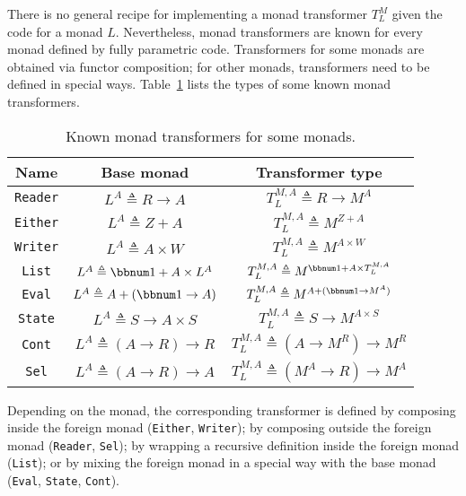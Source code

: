 There is no general recipe for implementing a monad transformer $T_{L}^{M}$
given the code for a monad $L$. Nevertheless, monad transformers
are known for every monad defined by fully parametric code. Transformers
for some monads are obtained via functor composition; for other monads,
transformers need to be defined in special ways. Table~\ref{tab:Known-monad-transformers}
lists the types of some known monad transformers.
\begin{table}
\begin{centering}
\begin{tabular}{|c|c|c|}
\hline 
\textbf{\small{}Name} & \textbf{\small{}Base monad} & \textbf{\small{}Transformer type}\tabularnewline
\hline 
\hline 
{\small{}}\lstinline!Reader! & {\small{}$L^{A}\triangleq R\rightarrow A$} & {\small{}$T_{L}^{M,A}\triangleq R\rightarrow M^{A}$}\tabularnewline
\hline 
{\small{}}\lstinline!Either! & {\small{}$L^{A}\triangleq Z+A$} & {\small{}$T_{L}^{M,A}\triangleq M^{Z+A}$}\tabularnewline
\hline 
{\small{}}\lstinline!Writer! & {\small{}$L^{A}\triangleq A\times W$} & {\small{}$T_{L}^{M,A}\triangleq M^{A\times W}$}\tabularnewline
\hline 
{\small{}}\lstinline!List! & {\small{}$L^{A}\triangleq\bbnum 1+A\times L^{A}$} & {\small{}$T_{L}^{M,A}\triangleq M^{\bbnum 1+A\times T_{L}^{M,A}}$}\tabularnewline
\hline 
{\small{}}\lstinline!Eval! & {\small{}$L^{A}\triangleq A+\left(\bbnum 1\rightarrow A\right)$} & {\small{}$T_{L}^{M,A}\triangleq M^{A+(\bbnum 1\rightarrow M^{A})}$}\tabularnewline
\hline 
{\small{}}\lstinline!State! & {\small{}$L^{A}\triangleq S\rightarrow A\times S$} & {\small{}$T_{L}^{M,A}\triangleq S\rightarrow M^{A\times S}$}\tabularnewline
\hline 
{\small{}}\lstinline!Cont! & {\small{}$L^{A}\triangleq\left(A\rightarrow R\right)\rightarrow R$} & {\small{}$T_{L}^{M,A}\triangleq(A\rightarrow M^{R})\rightarrow M^{R}$}\tabularnewline
\hline 
{\small{}}\lstinline!Sel! & {\small{}$L^{A}\triangleq\left(A\rightarrow R\right)\rightarrow A$} & {\small{}$T_{L}^{M,A}\triangleq(M^{A}\rightarrow R)\rightarrow M^{A}$}\tabularnewline
\hline 
\end{tabular}
\par\end{centering}
\caption{\label{tab:Known-monad-transformers}Known monad transformers for
some monads.}

\end{table}

Depending on the monad, the corresponding transformer is defined by
composing inside the foreign monad (\lstinline!Either!, \lstinline!Writer!);
by composing outside the foreign monad (\lstinline!Reader!, \lstinline!Sel!);
by wrapping a recursive definition inside the foreign monad (\lstinline!List!);
or by mixing the foreign monad in a special way with the base monad
(\lstinline!Eval!, \lstinline!State!, \lstinline!Cont!). 

